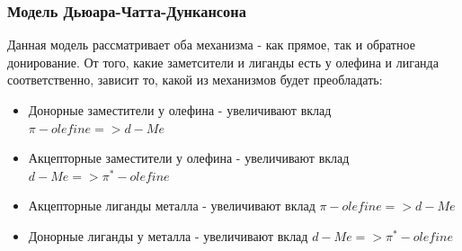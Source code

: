 \subsubsection*{Модель Дьюара-Чатта-Дункансона}

Данная модель рассматривает оба механизма - как прямое, так и обратное донирование. От того, какие заметсители и лиганды есть у олефина и лиганда соответственно, зависит то, какой из механизмов будет преобладать:

\begin{itemize}
	\item Донорные заместители у олефина - увеличивают вклад $\pi-olefine => d-Me$
	\item Акцепторные заместители у олефина - увеличивают вклад $d-Me => \pi^*-olefine$
	\item Акцепторные лиганды металла - увеличивают вклад $\pi-olefine => d-Me$
	\item Донорные лиганды у металла - увеличивают вклад $d-Me => \pi^*-olefine$
\end{itemize}






